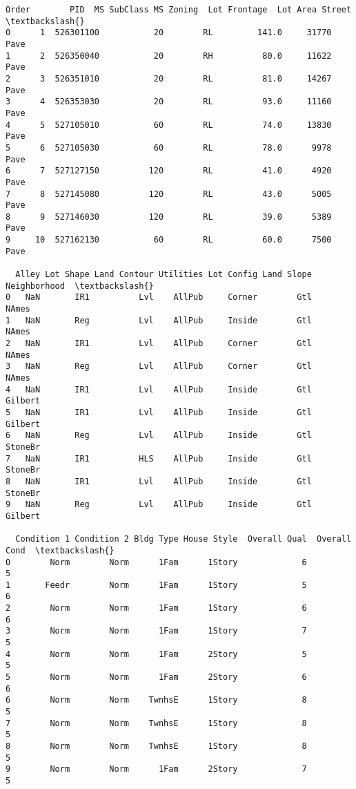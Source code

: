 \documentclass[11pt]{article}
\makeatletter
\newcommand{\boxspacing}{\kern\kvtcb@left@rule\kern\kvtcb@boxsep}
\newcommand{\prompt}[4]{
        {\ttfamily\llap{{\color{#2}[#3]:\hspace{3pt}#4}}\vspace{-\baselineskip}}
    }
\makeatother
\begin{document}
            \begin{tcolorbox}[breakable, size=fbox, boxrule=.5pt, pad at break*=1mm, opacityfill=0]
\prompt{Out}{outcolor}{ }{\boxspacing}
\begin{Verbatim}[commandchars=\\\{\}]
   Order        PID  MS SubClass MS Zoning  Lot Frontage  Lot Area Street  \textbackslash{}
0      1  526301100           20        RL         141.0     31770   Pave
1      2  526350040           20        RH          80.0     11622   Pave
2      3  526351010           20        RL          81.0     14267   Pave
3      4  526353030           20        RL          93.0     11160   Pave
4      5  527105010           60        RL          74.0     13830   Pave
5      6  527105030           60        RL          78.0      9978   Pave
6      7  527127150          120        RL          41.0      4920   Pave
7      8  527145080          120        RL          43.0      5005   Pave
8      9  527146030          120        RL          39.0      5389   Pave
9     10  527162130           60        RL          60.0      7500   Pave

  Alley Lot Shape Land Contour Utilities Lot Config Land Slope Neighborhood  \textbackslash{}
0   NaN       IR1          Lvl    AllPub     Corner        Gtl        NAmes
1   NaN       Reg          Lvl    AllPub     Inside        Gtl        NAmes
2   NaN       IR1          Lvl    AllPub     Corner        Gtl        NAmes
3   NaN       Reg          Lvl    AllPub     Corner        Gtl        NAmes
4   NaN       IR1          Lvl    AllPub     Inside        Gtl      Gilbert
5   NaN       IR1          Lvl    AllPub     Inside        Gtl      Gilbert
6   NaN       Reg          Lvl    AllPub     Inside        Gtl      StoneBr
7   NaN       IR1          HLS    AllPub     Inside        Gtl      StoneBr
8   NaN       IR1          Lvl    AllPub     Inside        Gtl      StoneBr
9   NaN       Reg          Lvl    AllPub     Inside        Gtl      Gilbert

  Condition 1 Condition 2 Bldg Type House Style  Overall Qual  Overall Cond  \textbackslash{}
0        Norm        Norm      1Fam      1Story             6             5
1       Feedr        Norm      1Fam      1Story             5             6
2        Norm        Norm      1Fam      1Story             6             6
3        Norm        Norm      1Fam      1Story             7             5
4        Norm        Norm      1Fam      2Story             5             5
5        Norm        Norm      1Fam      2Story             6             6
6        Norm        Norm    TwnhsE      1Story             8             5
7        Norm        Norm    TwnhsE      1Story             8             5
8        Norm        Norm    TwnhsE      1Story             8             5
9        Norm        Norm      1Fam      2Story             7             5


\end{Verbatim}
\end{tcolorbox}
\end{document}
